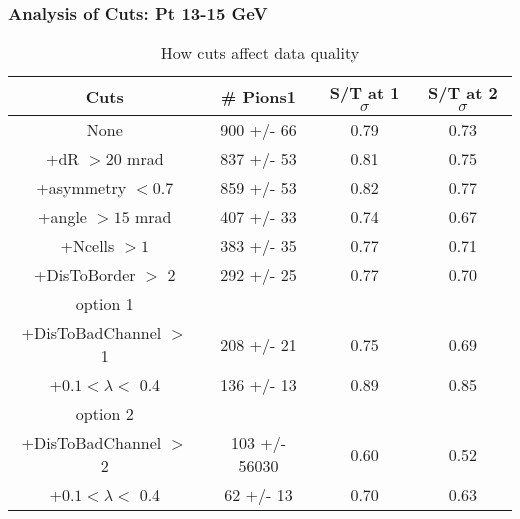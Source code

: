\frame
{
\frametitle{Analysis of Cuts: Pt 13-15 GeV}
\begin{table}
\caption{How cuts affect data quality}
\centering
\begin{tabular}{c c c c}
\hline\hline
Cuts & \# Pions1 & S/T at 1 $\sigma$ & S/T at 2 $\sigma$ \\ [0.5ex]
\hline
None &  900 +/-   66 & 0.79 & 0.73 \\ %
+dR $> 20$ mrad &  837 +/-   53 & 0.81 & 0.75 \\ %
+asymmetry $< 0.7$ &  859 +/-   53 & 0.82 & 0.77 \\ %
+angle $> 15$ mrad &  407 +/-   33 & 0.74 & 0.67 \\ %
+Ncells $> 1$&  383 +/-   35 & 0.77 & 0.71 \\ %
+DisToBorder $>$ 2 &  292 +/-   25 & 0.77 & 0.70 \\ %
option 1\\
+DisToBadChannel $>$ 1&  208 +/-   21 & 0.75 & 0.69 \\ %
+$0.1 < \lambda <$ 0.4 &  136 +/-   13 & 0.89 & 0.85 \\ %
option 2\\
+DisToBadChannel $>$ 2&  103 +/- 56030 & 0.60 & 0.52 \\ %
+$0.1 < \lambda <$ 0.4 &   62 +/-   13 & 0.70 & 0.63 \\ %
[1ex]
\hline
\end{tabular}
\label{table:nonlin}
\end{table}
}
